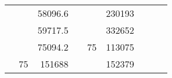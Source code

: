 \begin{table}[H]
\begin{tabular}{|ccrccrccc}
\multicolumn{1}{|c|}{\cellcolor[HTML]{FFFFC7}}                                & \multicolumn{1}{c|}{\cellcolor[HTML]{DAE8FC}}                      & \multicolumn{1}{r|}{\cellcolor[HTML]{DAE8FC}58096.6}   & \multicolumn{1}{c|}{\cellcolor[HTML]{FFFFC7}}                                & \multicolumn{1}{c|}{\cellcolor[HTML]{DAE8FC}}                       & \multicolumn{1}{r|}{\cellcolor[HTML]{DDFDFF}230193}    &                                                                              &                                                                    &                                                        \\ \cline{3-3} \cline{6-6}
\multicolumn{1}{|c|}{\cellcolor[HTML]{FFFFC7}}                                & \multicolumn{1}{c|}{\cellcolor[HTML]{DAE8FC}}                      & \multicolumn{1}{r|}{\cellcolor[HTML]{DDFDFF}59717.5}   & \multicolumn{1}{c|}{\cellcolor[HTML]{FFFFC7}}                                & \multicolumn{1}{c|}{\cellcolor[HTML]{DAE8FC}}                       & \multicolumn{1}{r|}{\cellcolor[HTML]{DAE8FC}332652}    &                                                                              &                                                                    &                                                        \\ \cline{3-3} \cline{6-6}
\multicolumn{1}{|c|}{\cellcolor[HTML]{FFFFC7}}                                & \multicolumn{1}{c|}{\cellcolor[HTML]{DAE8FC}}                      & \multicolumn{1}{r|}{\cellcolor[HTML]{DAE8FC}75094.2}   & \multicolumn{1}{c|}{\cellcolor[HTML]{FFFFC7}}                                & \multicolumn{1}{c|}{\multirow{-10}{*}{\cellcolor[HTML]{DAE8FC}75}}  & \multicolumn{1}{r|}{\cellcolor[HTML]{DDFDFF}113075}    &                                                                              &                                                                    &                                                        \\ \cline{3-3} \cline{5-6}
\multicolumn{1}{|c|}{\cellcolor[HTML]{FFFFC7}}                                & \multicolumn{1}{c|}{\multirow{-10}{*}{\cellcolor[HTML]{DAE8FC}75}} & \multicolumn{1}{r|}{\cellcolor[HTML]{DDFDFF}151688}    & \multicolumn{1}{c|}{\cellcolor[HTML]{FFFFC7}}                                & \multicolumn{1}{c|}{\cellcolor[HTML]{DDFDFF}}                       & \multicolumn{1}{r|}{\cellcolor[HTML]{DAE8FC}152379}    &                                                                              &                                                                    &                                                        \\ \cline{2-3} \cline{6-6}

\end{tabular}
\end{table}

